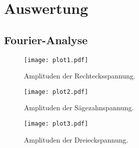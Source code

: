 \section{Auswertung}
\label{sec:Auswertung}

\subsection{Fourier-Analyse}
\label{sec:Auswertung_Analyse}



\begin{figure}
  \centering
  \texttt{[image: plot1.pdf]}
  \caption{Amplituden der Rechtecksspannung.}
  \label{fig:plot1}
\end{figure}
\begin{figure}
  \centering
  \texttt{[image: plot2.pdf]}
  \caption{Amplituden der Sägezahnspannung.}
  \label{fig:plot2}
\end{figure}
\begin{figure}
  \centering
  \texttt{[image: plot3.pdf]}
  \caption{Amplituden der Dreieckspannung.}
  \label{fig:plot3}
\end{figure}
